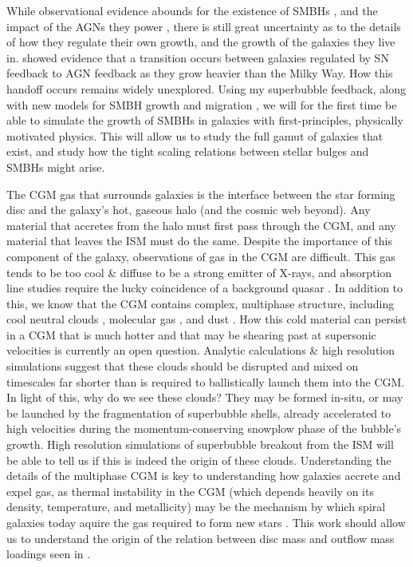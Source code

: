 While observational evidence abounds for the existence of SMBHs
\citep{Kormendy2013}, and the impact of the AGNs they power
\citep{Veilleux2005}, there is still great uncertainty as to the details of how
they regulate their own growth, and the growth of the galaxies they live in.
\citet{Keller2016a} showed evidence that a transition occurs between galaxies
regulated by SN feedback to AGN feedback as they grow heavier than the Milky
Way.  How this handoff occurs remains widely unexplored.  Using my superbubble
feedback, along with new models for SMBH growth \citep{Hopkins2010} and
migration \citep{Tremmel2015}, we will for the first time be able to simulate
the growth of SMBHs in galaxies with first-principles, physically motivated
physics.  This will allow us to study the full gamut of galaxies that exist, and
study how the tight scaling relations between stellar bulges and SMBHs might
arise.

The CGM gas that surrounds galaxies is the interface between the star forming
disc and the galaxy's hot, gaseous halo (and the cosmic web beyond).  Any
material that accretes from the halo must first pass through the CGM, and any
material that leaves the ISM must do the same.  Despite the importance
of this component of the galaxy, observations of gas in the CGM are difficult.
This gas tends to be too cool \& diffuse to be a strong emitter of X-rays, and
absorption line studies require the lucky coincidence of a background quasar
\citep{Weiner2009}.  In addition to this, we know that the CGM contains complex,
multiphase structure, including cool neutral clouds \citep{Wakker1997},
molecular gas \citep{Stark1984}, and dust .  How this cold material can persist in a
CGM that is much hotter and that may be shearing past at supersonic velocities
is currently an open question.  Analytic calculations \& high resolution
simulations suggest that these clouds should be disrupted and mixed on
timescales far shorter than is required to ballistically launch them into the
CGM.  In light of this, why do we see these clouds?  They may be formed in-situ,
or may be launched by the fragmentation of superbubble shells, already
accelerated to high velocities during the momentum-conserving snowplow phase of
the bubble's growth.  High resolution simulations of superbubble breakout from
the ISM will be able to tell us if this is indeed the origin of these clouds.
Understanding the details of the multiphase CGM is key to
understanding how galaxies accrete and expel gas, as thermal instability in the
CGM (which depends heavily on its density, temperature, and metallicity) may be
the mechanism by which spiral galaxies today aquire the gas required to
form new stars \citep{Marasco2012}.  This work should allow us to understand the
origin of the relation between disc mass and outflow mass loadings seen in
\citet{Keller2016a}.


